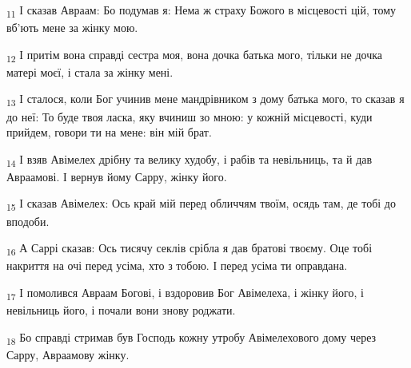 \begin{tcolorbox}
\textsubscript{11} І сказав Авраам: Бо подумав я: Нема ж страху Божого в місцевості цій, тому вб'ють мене за жінку мою.
\end{tcolorbox}
\begin{tcolorbox}
\textsubscript{12} І притім вона справді сестра моя, вона дочка батька мого, тільки не дочка матері моєї, і стала за жінку мені.
\end{tcolorbox}
\begin{tcolorbox}
\textsubscript{13} І сталося, коли Бог учинив мене мандрівником з дому батька мого, то сказав я до неї: То буде твоя ласка, яку вчиниш зо мною: у кожній місцевості, куди прийдем, говори ти на мене: він мій брат.
\end{tcolorbox}
\begin{tcolorbox}
\textsubscript{14} І взяв Авімелех дрібну та велику худобу, і рабів та невільниць, та й дав Авраамові. І вернув йому Сарру, жінку його.
\end{tcolorbox}
\begin{tcolorbox}
\textsubscript{15} І сказав Авімелех: Ось край мій перед обличчям твоїм, осядь там, де тобі до вподоби.
\end{tcolorbox}
\begin{tcolorbox}
\textsubscript{16} А Саррі сказав: Ось тисячу секлів срібла я дав братові твоєму. Оце тобі накриття на очі перед усіма, хто з тобою. І перед усіма ти оправдана.
\end{tcolorbox}
\begin{tcolorbox}
\textsubscript{17} І помолився Авраам Богові, і вздоровив Бог Авімелеха, і жінку його, і невільниць його, і почали вони знову роджати.
\end{tcolorbox}
\begin{tcolorbox}
\textsubscript{18} Бо справді стримав був Господь кожну утробу Авімелехового дому через Сарру, Авраамову жінку.
\end{tcolorbox}
